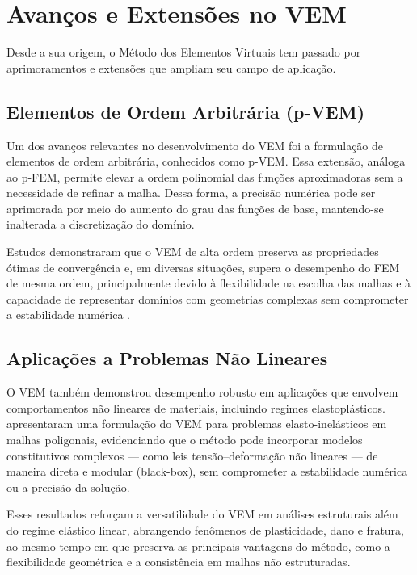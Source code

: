 \documentclass[12pt,openright,oneside,a4paper,english,brazil]{abntex2}
\begin{document}
\section{Avanços e Extensões no VEM}

Desde a sua origem, o Método dos Elementos Virtuais tem passado por aprimoramentos e extensões que ampliam seu campo de aplicação.

\subsection{Elementos de Ordem Arbitrária (p-VEM)}

Um dos avanços relevantes no desenvolvimento do VEM foi a formulação de elementos de ordem arbitrária, conhecidos como p-VEM. Essa extensão, análoga ao p-FEM, permite elevar a ordem polinomial das funções aproximadoras sem a necessidade de refinar a malha. Dessa forma, a precisão numérica pode ser aprimorada por meio do aumento do grau das funções de base, mantendo-se inalterada a discretização do domínio.

Estudos demonstraram que o VEM de alta ordem preserva as propriedades ótimas de convergência e, em diversas situações, supera o desempenho do FEM de mesma ordem, principalmente devido à flexibilidade na escolha das malhas e à capacidade de representar domínios com geometrias complexas sem comprometer a estabilidade numérica \cite{mengolini2019}.

\subsection{Aplicações a Problemas Não Lineares}

O VEM também demonstrou desempenho robusto em aplicações que envolvem comportamentos não lineares de materiais, incluindo regimes elastoplásticos. \textcite{beirao2015} apresentaram uma formulação do VEM para problemas elasto-inelásticos em malhas poligonais, evidenciando que o método pode incorporar modelos constitutivos complexos — como leis tensão–deformação não lineares — de maneira direta e modular (black-box), sem comprometer a estabilidade numérica ou a precisão da solução.

Esses resultados reforçam a versatilidade do VEM em análises estruturais além do regime elástico linear, abrangendo fenômenos de plasticidade, dano e fratura, ao mesmo tempo em que preserva as principais vantagens do método, como a flexibilidade geométrica e a consistência em malhas não estruturadas.
\end{document}
